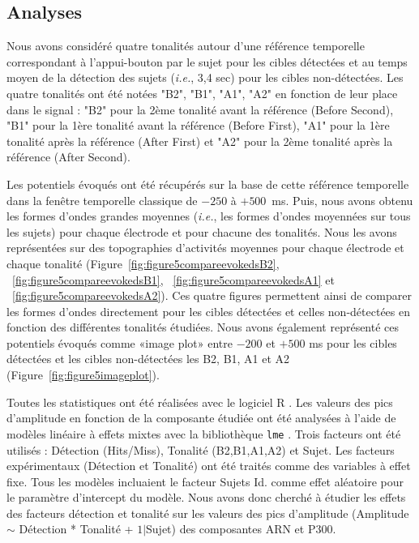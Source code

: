 \subsection{Analyses}
\label{etude2analysesERPanalyses}

Nous avons considéré quatre tonalités autour d'une référence temporelle correspondant à l'appui-bouton par le sujet pour les cibles détectées et au temps moyen de la détection des sujets (\textit{i.e.}, 3,4 sec) pour les cibles non-détectées. 
Les quatre tonalités ont été notées "B2", "B1", "A1", "A2" en fonction de leur place dans le signal : "B2" pour la 2ème tonalité avant la référence (Before Second), "B1" pour la 1ère tonalité avant la référence (Before First), "A1" pour la 1ère tonalité après la référence (After First) et "A2" pour la 2ème tonalité après la référence (After Second). 

Les potentiels évoqués ont été récupérés sur la base de cette référence temporelle dans la fenêtre temporelle classique de $-250$ à $+500$~ms. 
Puis, nous avons obtenu les formes d'ondes grandes moyennes (\textit{i.e.}, les formes d'ondes moyennées sur tous les sujets) pour chaque électrode et pour chacune des tonalités. 
Nous les avons représentées sur des topographies d'activités moyennes pour chaque électrode et chaque tonalité (Figure~\ref{fig:figure5compareevokedsB2}, ~\ref{fig:figure5compareevokedsB1}, ~\ref{fig:figure5compareevokedsA1} et ~\ref{fig:figure5compareevokedsA2}). 
Ces quatre figures permettent ainsi de comparer les formes d'ondes directement pour les cibles détectées et celles non-détectées en fonction des différentes tonalités étudiées. 
Nous avons également représenté ces potentiels évoqués comme «image plot» entre $-200$ et $+500$ ms pour les cibles détectées et les cibles non-détectées les B2, B1, A1 et A2 (Figure~\ref{fig:figure5imageplot}). 

Toutes les statistiques ont été réalisées avec le logiciel R \citep{Rlanguage2021}. 
Les valeurs des pics d'amplitude en fonction de la composante étudiée ont été analysées à l'aide de modèles linéaire à effets mixtes avec la bibliothèque \texttt{lme} \citep{bates2007lme4}. 
Trois facteurs ont été utilisés : Détection (Hits/Miss), Tonalité (B2,B1,A1,A2) et Sujet. 
Les facteurs expérimentaux (Détection et Tonalité) ont été traités comme des variables à effet fixe. 
Tous les modèles incluaient le facteur Sujets Id. comme effet aléatoire pour le paramètre d'intercept du modèle. 
Nous avons donc cherché à étudier les effets des facteurs détection et tonalité sur les valeurs des pics d'amplitude (Amplitude $\sim$ Détection * Tonalité + $1|$Sujet) des composantes ARN et P300.  

